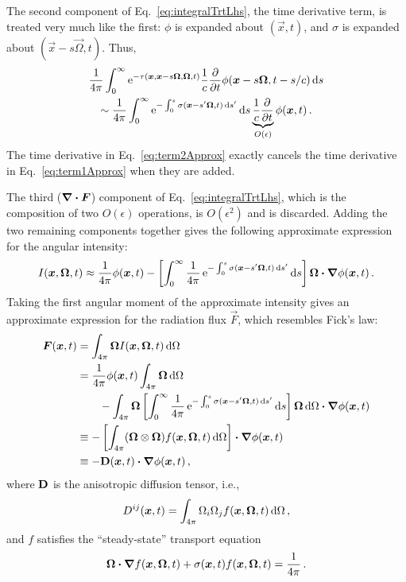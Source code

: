 \documentclass[11pt,letter,twoside]{mc2011}
\begin{document}
The second component of Eq.~\eqref{eq:integralTrtLhs}, the time derivative
term, is treated very much like the first: $\phi$ is expanded about
$(\vec{x},t)$, and $\sigma$ is expanded about $(\vec{x}-s\vec{\Omega},t)$. Thus,
\begin{multline}\label{eq:term2Approx}
  \frac{1}{4\pi}\int_{0}^{\infty} \mathop{}\!\mathrm{e}^{ -\tau(\bm{x}, \bm{x} - s
  \bm{\Omega}, \bm{\Omega}, t)}
  \frac{1}{c} \frac{\partial }{\partial t}\phi(\bm{x} - s \bm{\Omega}, t-s/c) \mathop{}\!\mathrm{d} s
 \\
 \sim 
  \frac{1}{4\pi}\int_{0}^{\infty} \mathop{}\!\mathrm{e}^{- \int_{0}^{s} \sigma(\bm{x}-s'\bm{\Omega}, t)
  \mathop{}\!\mathrm{d} s'} \mathop{}\!\mathrm{d} s
  \underbrace{\frac{1}{c} \frac{\partial }{\partial t}}_{O(\epsilon)}\phi(\bm{x}, t)\,.
\end{multline}
The time derivative in Eq.~\eqref{eq:term2Approx} exactly cancels the time
derivative in Eq.~\eqref{eq:term1Approx} when they are added.

The third ($\bm{\nabla} \bm{\cdot} \bm{F}$) component of Eq.~\eqref{eq:integralTrtLhs}, which
is the composition of two $O(\epsilon)$ operations, is $O(\epsilon^2)$ and is
discarded. Adding the two remaining components together gives the
following approximate
expression for the angular intensity:
\begin{equation} \label{eq:anisotropicIntensity}
  I(\bm{x}, \bm{\Omega}, t) \approx
  \frac{1}{4\pi}\phi(\bm{x}, t) - \left[ \int_{0}^{\infty} \frac{1}{4\pi}
  \mathop{}\!\mathrm{e}^{- \int_{0}^{s} \sigma(\bm{x}-s'\bm{\Omega}, t)
  \mathop{}\!\mathrm{d} s'} \mathop{}\!\mathrm{d} s\right]
\bm{\Omega} \bm{\cdot} \bm{\nabla} \phi(\bm{x}, t) \,.
\end{equation}
Taking the first angular moment of the approximate intensity gives an
approximate expression for the radiation flux $\vec{F}$, which resembles Fick's
law:
\begin{align}\nonumber
  \bm{F}(\bm{x}, t) &= \int_{4\pi} \bm{\Omega} I(\bm{x}, \bm{\Omega}, t) \mathop{}\!\mathrm{d} \Omega
  \\\nonumber
  &=
  \frac{1}{4\pi}\phi(\bm{x}, t) \int_{4\pi} \bm{\Omega} \mathop{}\!\mathrm{d} \Omega
  \\\nonumber
  &\qquad-  \int_{4\pi} \bm{\Omega} \left[ \int_{0}^{\infty} \frac{1}{4\pi}
  \mathop{}\!\mathrm{e}^{- \int_{0}^{s} \sigma(\bm{x}-s'\bm{\Omega}, t)
  \mathop{}\!\mathrm{d} s'} \mathop{}\!\mathrm{d} s\right]
\bm{\Omega}  \mathop{}\!\mathrm{d} \Omega \bm{\cdot} \bm{\nabla} \phi(\bm{x}, t)
\\\nonumber
&\equiv - \left[ \int_{4\pi} (\bm{\Omega} \otimes \bm{\Omega})  f(\bm{x},\bm{\Omega},t)
 \mathop{}\!\mathrm{d} \Omega \right] \bm{\cdot} \bm{\nabla} \phi(\bm{x}, t)
 \\\label{eq:adFlux}
&\equiv - \mathbf{D}(\bm{x},t) \bm{\cdot} \bm{\nabla} \phi(\bm{x}, t)\,,
\end{align}
where $\mathbf{D}$ is the anisotropic diffusion tensor, i.e.,
\begin{equation} \label{eq:dTensorComponents}
  D^{ij}(\bm{x},t) = \int_{4\pi} \Omega_i \Omega_j f(\bm{x}, \bm{\Omega}, t)
  \mathop{}\!\mathrm{d} \Omega\,,
\end{equation}
and $f$ satisfies the
``steady-state'' transport equation
\begin{equation} \label{eq:dcoeffTransportEquation}
  \bm{\Omega}\bm{\cdot} \bm{\nabla} f(\bm{x},\bm{\Omega},t) + \sigma(\bm{x},t) f(\bm{x},\bm{\Omega},t) =
  \frac{1}{4\pi}\,.
\end{equation}
\end{document}
